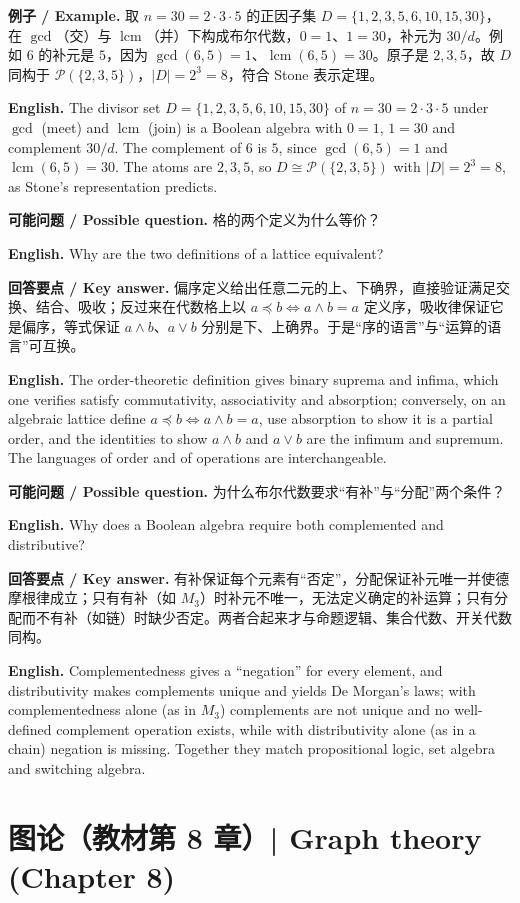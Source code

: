\documentclass[UTF8,11pt,a4paper]{ctexart}
\newcommand{\EN}[1]{\par\noindent \textbf{English.} #1\par}
\newcommand{\EX}[2]{\par\noindent \textbf{例子 / Example.} #1\par\EN{#2}}
\newcommand{\ASK}[4]{\par\noindent \textbf{可能问题 / Possible question.} #1\par\EN{#2}\noindent \textbf{回答要点 / Key answer.} #3\par\EN{#4}\medskip}
\begin{document}
\EX{取 $n=30=2\cdot3\cdot5$ 的正因子集 $D=\{1,2,3,5,6,10,15,30\}$，在 $\gcd$（交）与 $\operatorname{lcm}$（并）下构成布尔代数，$0=1$、$1=30$，补元为 $30/d$。例如 $6$ 的补元是 $5$，因为 $\gcd(6,5)=1$、$\operatorname{lcm}(6,5)=30$。原子是 $2,3,5$，故 $D$ 同构于 $\mathcal P(\{2,3,5\})$，$|D|=2^3=8$，符合 Stone 表示定理。}{The divisor set $D=\{1,2,3,5,6,10,15,30\}$ of $n=30=2\cdot3\cdot5$ under $\gcd$ (meet) and $\operatorname{lcm}$ (join) is a Boolean algebra with $0=1$, $1=30$ and complement $30/d$. The complement of $6$ is $5$, since $\gcd(6,5)=1$ and $\operatorname{lcm}(6,5)=30$. The atoms are $2,3,5$, so $D\cong\mathcal P(\{2,3,5\})$ with $|D|=2^3=8$, as Stone's representation predicts.}

\ASK{格的两个定义为什么等价？}{Why are the two definitions of a lattice equivalent?}{偏序定义给出任意二元的上、下确界，直接验证满足交换、结合、吸收；反过来在代数格上以 $a\preccurlyeq b\Leftrightarrow a\wedge b=a$ 定义序，吸收律保证它是偏序，等式保证 $a\wedge b$、$a\vee b$ 分别是下、上确界。于是“序的语言”与“运算的语言”可互换。}{The order-theoretic definition gives binary suprema and infima, which one verifies satisfy commutativity, associativity and absorption; conversely, on an algebraic lattice define $a\preccurlyeq b\Leftrightarrow a\wedge b=a$, use absorption to show it is a partial order, and the identities to show $a\wedge b$ and $a\vee b$ are the infimum and supremum. The languages of order and of operations are interchangeable.}
\ASK{为什么布尔代数要求“有补”与“分配”两个条件？}{Why does a Boolean algebra require both complemented and distributive?}{有补保证每个元素有“否定”，分配保证补元唯一并使德摩根律成立；只有有补（如 $M_3$）时补元不唯一，无法定义确定的补运算；只有分配而不有补（如链）时缺少否定。两者合起来才与命题逻辑、集合代数、开关代数同构。}{Complementedness gives a ``negation'' for every element, and distributivity makes complements unique and yields De Morgan's laws; with complementedness alone (as in $M_3$) complements are not unique and no well-defined complement operation exists, while with distributivity alone (as in a chain) negation is missing. Together they match propositional logic, set algebra and switching algebra.}

\section[图论（第 8 章）]{图论（教材第 8 章）| Graph theory (Chapter 8)}
\end{document}
